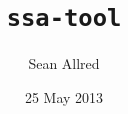 \documentclass{cs-smp}[2013/12/23]
\title{\texttt{ssa-tool}}%
            [A Utility for the Creation and Evaluation \\
                   of Self-Stabilizing Algorithms]
\author{Sean Allred}
\date{25 May 2013}
\begin{document}
\maketitle
\begin{abstract}
  
\end{abstract}
\end{document}
